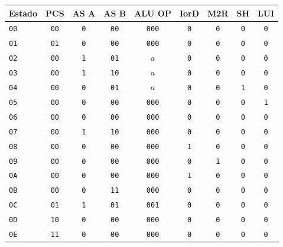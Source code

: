 \documentclass[11pt,a4paper]{article}
\begin{document}
\begin{center}
\small
\setlength{\tabcolsep}{5.4pt}
\begin{tabular}{@{}lcccccccc@{}}
\toprule
Estado & PCS & AS A & AS B & ALU OP & IorD & M2R & SH & LUI \\
\midrule
\texttt{00} & \texttt{00} & \texttt{0} & \texttt{00} & \texttt{000} & \texttt{0} & \texttt{0} & \texttt{0} & \texttt{0} \\
\texttt{01} & \texttt{01} & \texttt{0} & \texttt{00} & \texttt{000} & \texttt{0} & \texttt{0} & \texttt{0} & \texttt{0} \\
\texttt{02} & \texttt{00} & \texttt{1} & \texttt{01} & $a$ & \texttt{0} & \texttt{0} & \texttt{0} & \texttt{0} \\
\texttt{03} & \texttt{00} & \texttt{1} & \texttt{10} & $a$ & \texttt{0} & \texttt{0} & \texttt{0} & \texttt{0} \\
\texttt{04} & \texttt{00} & \texttt{0} & \texttt{01} & $a$ & \texttt{0} & \texttt{0} & \texttt{1} & \texttt{0} \\
\texttt{05} & \texttt{00} & \texttt{0} & \texttt{00} & \texttt{000} & \texttt{0} & \texttt{0} & \texttt{0} & \texttt{1} \\
\texttt{06} & \texttt{00} & \texttt{0} & \texttt{00} & \texttt{000} & \texttt{0} & \texttt{0} & \texttt{0} & \texttt{0} \\
\texttt{07} & \texttt{00} & \texttt{1} & \texttt{10} & \texttt{000} & \texttt{0} & \texttt{0} & \texttt{0} & \texttt{0} \\
\texttt{08} & \texttt{00} & \texttt{0} & \texttt{00} & \texttt{000} & \texttt{1} & \texttt{0} & \texttt{0} & \texttt{0} \\
\texttt{09} & \texttt{00} & \texttt{0} & \texttt{00} & \texttt{000} & \texttt{0} & \texttt{1} & \texttt{0} & \texttt{0} \\
\texttt{0A} & \texttt{00} & \texttt{0} & \texttt{00} & \texttt{000} & \texttt{1} & \texttt{0} & \texttt{0} & \texttt{0} \\
\texttt{0B} & \texttt{00} & \texttt{0} & \texttt{11} & \texttt{000} & \texttt{0} & \texttt{0} & \texttt{0} & \texttt{0} \\
\texttt{0C} & \texttt{01} & \texttt{1} & \texttt{01} & \texttt{001} & \texttt{0} & \texttt{0} & \texttt{0} & \texttt{0} \\
\texttt{0D} & \texttt{10} & \texttt{0} & \texttt{00} & \texttt{000} & \texttt{0} & \texttt{0} & \texttt{0} & \texttt{0} \\
\texttt{0E} & \texttt{11} & \texttt{0} & \texttt{00} & \texttt{000} & \texttt{0} & \texttt{0} & \texttt{0} & \texttt{0} \\

\end{tabular}
\end{center}
\end{document}
